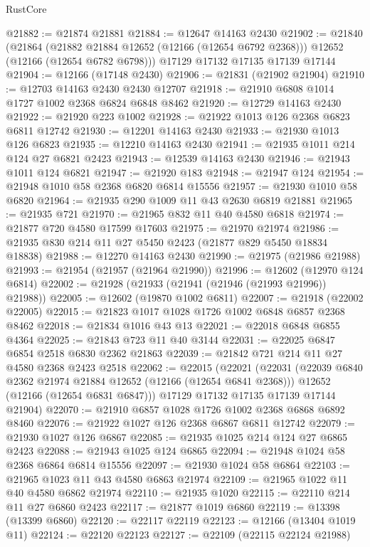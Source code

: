 \begin{lexlean}{RustCore}
\begin{coremodule}
@21882 := @21874 @21881
@21884 := @12647 @14163 @2430
@21902 := @21840
    (@21864
      (@21882 @21884 @12652 (@12166 (@12654 @6792 @2368)))
      @12652
      (@12166 (@12654 @6782 @6798)))
    @17129
    @17132
    @17135
    @17139
    @17144
@21904 := @12166 (@17148 @2430)
@21906 := @21831 (@21902 @21904)
@21910 := @12703 @14163 @2430 @2430 @12707
@21918 := @21910 @6808 @1014 @1727 @1002 @2368 @6824 @6848 @8462
@21920 := @12729 @14163 @2430
@21922 := @21920 @223 @1002
@21928 := @21922 @1013 @126 @2368 @6823 @6811 @12742
@21930 := @12201 @14163 @2430
@21933 := @21930 @1013 @126 @6823
@21935 := @12210 @14163 @2430
@21941 := @21935 @1011 @214 @124 @27 @6821 @2423
@21943 := @12539 @14163 @2430
@21946 := @21943 @1011 @124 @6821
@21947 := @21920 @183
@21948 := @21947 @124
@21954 := @21948 @1010 @58 @2368 @6820 @6814 @15556
@21957 := @21930 @1010 @58 @6820
@21964 := @21935 @290 @1009 @11 @43 @2630 @6819 @21881
@21965 := @21935 @721
@21970 := @21965 @832 @11 @40 @4580 @6818
@21974 := @21877 @720 @4580 @17599 @17603
@21975 := @21970 @21974
@21986 := @21935 @830 @214 @11 @27 @5450 @2423 (@21877 @829 @5450 @18834 @18838)
@21988 := @12270 @14163 @2430
@21990 := @21975 (@21986 @21988)
@21993 := @21954 (@21957 (@21964 @21990))
@21996 := @12602 (@12970 @124 @6814)
@22002 := @21928 (@21933 (@21941 (@21946 (@21993 @21996)) @21988))
@22005 := @12602 (@19870 @1002 @6811)
@22007 := @21918 (@22002 @22005)
@22015 := @21823 @1017 @1028 @1726 @1002 @6848 @6857 @2368 @8462
@22018 := @21834 @1016 @43 @13
@22021 := @22018 @6848 @6855 @4364
@22025 := @21843 @723 @11 @40 @3144
@22031 := @22025 @6847 @6854 @2518 @6830 @2362 @21863
@22039 := @21842 @721 @214 @11 @27 @4580 @2368 @2423 @2518
@22062 := @22015
    (@22021
      (@22031
        (@22039 @6840 @2362 @21974 @21884 @12652 (@12166 (@12654 @6841 @2368)))
        @12652
        (@12166 (@12654 @6831 @6847)))
      @17129
      @17132
      @17135
      @17139
      @17144
      @21904)
@22070 := @21910 @6857 @1028 @1726 @1002 @2368 @6868 @6892 @8460
@22076 := @21922 @1027 @126 @2368 @6867 @6811 @12742
@22079 := @21930 @1027 @126 @6867
@22085 := @21935 @1025 @214 @124 @27 @6865 @2423
@22088 := @21943 @1025 @124 @6865
@22094 := @21948 @1024 @58 @2368 @6864 @6814 @15556
@22097 := @21930 @1024 @58 @6864
@22103 := @21965 @1023 @11 @43 @4580 @6863 @21974
@22109 := @21965 @1022 @11 @40 @4580 @6862 @21974
@22110 := @21935 @1020
@22115 := @22110 @214 @11 @27 @6860 @2423
@22117 := @21877 @1019 @6860
@22119 := @13398 (@13399 @6860)
@22120 := @22117 @22119
@22123 := @12166 (@13404 @1019 @11)
@22124 := @22120 @22123
@22127 := @22109 (@22115 @22124 @21988)

\end{coremodule}
\end{lexlean}
